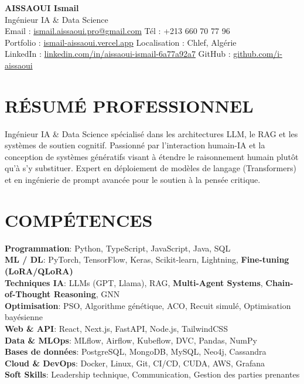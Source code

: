 \documentclass[a4paper,12pt]{article}
\begin{document}
\begin{center}
    {\Huge\bfseries\color{titleblue} AISSAOUI Ismail}\\[4pt]
    {\Large Ingénieur IA \& Data Science}\\[6pt]

    {\normalsize
    Email : \href{mailto:ismail.aissaoui.pro@gmail.com}{ismail.aissaoui.pro@gmail.com} \quad
    Tél : +213 660 70 77 96 \\
    Portfolio : \href{https://ismail-aissaoui.vercel.app}{ismail-aissaoui.vercel.app} \quad
    Localisation : Chlef, Algérie \\
    LinkedIn : \href{https://linkedin.com/in/aissaoui-ismail-6a77a92a7}{linkedin.com/in/aissaoui-ismail-6a77a92a7} \quad
    GitHub : \href{https://github.com/i-aissaoui}{github.com/i-aissaoui}
    }
\end{center}

\section{RÉSUMÉ PROFESSIONNEL}
Ingénieur IA \& Data Science spécialisé dans les architectures LLM, le RAG et les systèmes de soutien cognitif. Passionné par l'interaction humain-IA et la conception de systèmes génératifs visant à étendre le raisonnement humain plutôt qu'à s'y substituer. Expert en déploiement de modèles de langage (Transformers) et en ingénierie de prompt avancée pour le soutien à la pensée critique.

\section{COMPÉTENCES}
\setlength{\parskip}{-1pt}
{\normalsize
\textbf{Programmation}: Python, TypeScript, JavaScript, Java, SQL \\

\textbf{ML / DL}: PyTorch, TensorFlow, Keras, Scikit-learn, Lightning, \textbf{Fine-tuning (LoRA/QLoRA)} \\

\textbf{Techniques IA}: LLMs (GPT, Llama), RAG, \textbf{Multi-Agent Systems}, \textbf{Chain-of-Thought Reasoning}, GNN \\

\textbf{Optimisation}: PSO, Algorithme génétique, ACO, Recuit simulé, Optimisation bayésienne \\

\textbf{Web \& API}: React, Next.js, FastAPI, Node.js, TailwindCSS \\

\textbf{Data \& MLOps}: MLflow, Airflow, Kubeflow, DVC, Pandas, NumPy \\

\textbf{Bases de données}: PostgreSQL, MongoDB, MySQL, Neo4j, Cassandra \\

\textbf{Cloud \& DevOps}: Docker, Linux, Git, CI/CD, CUDA, AWS, Grafana \\

\textbf{Soft Skills}: Leadership technique, Communication, Gestion des parties prenantes
}
\end{document}
